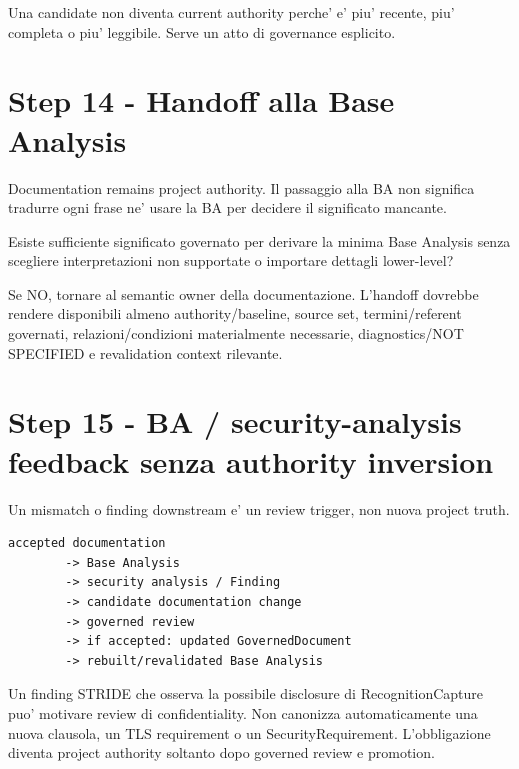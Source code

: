 \documentclass[11pt,a4paper]{article}
\begin{document}
\begin{ddtacore}[title={Promotion non e' recency}]
Una candidate non diventa current authority perche' e' piu' recente, piu' completa o piu' leggibile. Serve un atto di governance esplicito.
\end{ddtacore}

\section{Step 14 - Handoff alla Base Analysis}
\closedtag

Documentation remains project authority. Il passaggio alla BA non significa tradurre ogni frase ne' usare la BA per decidere il significato mancante.

\begin{ddtacheck}[title={Handoff question}]
Esiste sufficiente significato governato per derivare la minima Base Analysis senza scegliere interpretazioni non supportate o importare dettagli lower-level?
\end{ddtacheck}

Se NO, tornare al semantic owner della documentazione. L'handoff dovrebbe rendere disponibili almeno authority/baseline, source set, termini/referent governati, relazioni/condizioni materialmente necessarie, diagnostics/NOT SPECIFIED e revalidation context rilevante.

\section{Step 15 - BA / security-analysis feedback senza authority inversion}
\closedtag

Un mismatch o finding downstream e' un review trigger, non nuova project truth.

\begin{lstlisting}
accepted documentation
        -> Base Analysis
        -> security analysis / Finding
        -> candidate documentation change
        -> governed review
        -> if accepted: updated GovernedDocument
        -> rebuilt/revalidated Base Analysis
\end{lstlisting}

\begin{ddtaexample}[title={Finding != SecurityRequirement}]
Un finding STRIDE che osserva la possibile disclosure di RecognitionCapture puo' motivare review di confidentiality. Non canonizza automaticamente una nuova clausola, un TLS requirement o un SecurityRequirement. L'obbligazione diventa project authority soltanto dopo governed review e promotion.
\end{ddtaexample}
\end{document}
